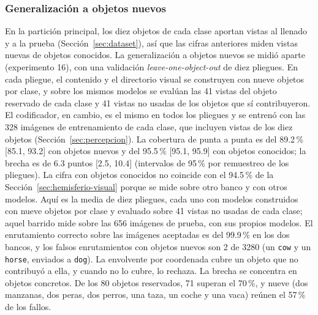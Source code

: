 \subsubsection{Generalización a objetos nuevos}
\label{sec:objetos-nuevos}

En la partición principal, los diez objetos de cada clase aportan vistas al llenado y a
la prueba (Sección~\ref{sec:dataset}), así que las cifras anteriores miden vistas nuevas
de objetos conocidos.
La generalización a objetos nuevos se midió aparte (experimento 16), con una validación
\textit{leave-one-object-out} de diez pliegues.
En cada pliegue, el contenido y el directorio visual se construyen con nueve objetos por
clase, y sobre los mismos modelos se evalúan las 41 vistas del objeto reservado de cada
clase y 41 vistas no usadas de los objetos que sí contribuyeron.
El codificador, en cambio, es el mismo en todos los pliegues y se entrenó con las 328
imágenes de entrenamiento de cada clase, que incluyen vistas de los diez objetos
(Sección~\ref{sec:percepcion}).
La cobertura de punta a punta es del 89.2\,\% [85.1, 93.2] con objetos nuevos y del
95.5\,\% [95.1, 95.9] con objetos conocidos; la brecha es de 6.3 puntos [2.5, 10.4]
(intervalos de 95\,\% por remuestreo de los pliegues).
La cifra con objetos conocidos no coincide con el 94.5\,\% de la
Sección~\ref{sec:hemisferio-visual} porque se mide sobre otro banco y con otros modelos.
Aquí es la media de diez pliegues, cada uno con modelos construidos con nueve objetos
por clase y evaluado sobre 41 vistas no usadas de cada clase; aquel barrido mide sobre
las 656 imágenes de prueba, con sus propios modelos.
El enrutamiento correcto sobre las imágenes aceptadas es del 99.9\,\% en los dos bancos,
y los falsos enrutamientos con objetos nuevos son 2 de 3280 (un \texttt{cow} y un
\texttt{horse}, enviados a \texttt{dog}).
La envolvente por coordenada cubre un objeto que no contribuyó a ella, y cuando no lo
cubre, lo rechaza.
La brecha se concentra en objetos concretos.
De los 80 objetos reservados, 71 superan el 70\,\%, y nueve (dos manzanas, dos peras,
dos perros, una taza, un coche y una vaca) reúnen el 57\,\% de los fallos.

